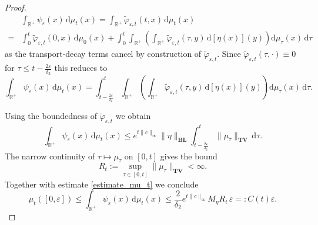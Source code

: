 \documentclass[10pt,a4paper]{amsart}
\newcommand{\BLN}{\mathbf{BL}}
\newcommand{\R}{\mathbb{R}}
\newcommand{\TV}{\mathbf{TV}}
\newcommand{\reali}{\mathbb{R}}
\newcommand{\ud}{\mathrm{d}}
\begin{document}
\begin{proof}
    \begin{align*}
&\int_{\R^+}\psi_\varepsilon(x)\,\ud\mu_t(x)
=\int_{\R^+}\tilde\varphi_{\varepsilon,t}(t,x)\,\ud\mu_t(x)\\
\iffalse
=&\int_0^t\tilde\varphi_{\varepsilon,t}(0,x)\,\ud\mu_0(x)\\
&+\int_0^t \int_{\reali^+} \left(
   \partial_{\tau}\tilde\varphi_{\varepsilon,t}(\tau,x) + b(x) \; \partial_x
   \tilde\varphi_{\varepsilon,t}(t,x) - c(x) \; \tilde\varphi_{\varepsilon,t}(t,x) \right)\,\ud\mu_{\tau}(x)\,\ud{\tau}   \\
   &+\int_0^t
\int_{\R^+}
\left(
\int_{\R^+}
\tilde \varphi_{\varepsilon,t}(\tau,y)\,
\ud[\eta(x)](y)
\right)
\ud\mu_\tau(x)\,\ud\tau\\
\fi
=&\int_0^t\tilde\varphi_{\varepsilon,t}(0,x)\,\ud\mu_0(x)+
\int_0^t
\int_{\R^+}
\left(
\int_{\R^+}
\tilde \varphi_{\varepsilon,t}(\tau,y)\,
\ud[\eta(x)](y)
\right)
\ud\mu_\tau(x)\,\ud\tau
\end{align*}
as the transport-decay terms cancel
by construction of $\tilde \varphi_{\varepsilon,t}$. Since $\tilde \varphi_{\varepsilon,t}(\tau,\cdot)\equiv0$ for $\tau\leq t-\frac {2\varepsilon}{\delta_2}$ this reduces to
\[
\int_{\R^+}\psi_\varepsilon(x)\,\ud\mu_t(x)
=
\int_{t-\frac{2\varepsilon}{\delta_2}}^t
\int_{\R^+}
\left(
\int_{\R^+}
\tilde \varphi_{\varepsilon,t}(\tau,y)\,
\ud[\eta(x)](y)
\right)
\ud\mu_\tau(x)\,\ud\tau.
\]

\noindent Using the boundedness of $\tilde \varphi_{\varepsilon,t}$ we obtain
\[
\int_{\R^+}\psi_\varepsilon(x)\,\ud\mu_t(x)
\le
e^{t\|c\|_\infty}\|\eta\|_{\BLN}
\int_{t-\frac{2\varepsilon}{\delta_2}}^t
\|\mu_\tau\|_{\TV}\,\ud\tau.
\]
The narrow continuity of $\tau\mapsto\mu_\tau$ on $[0,t]$ gives the bound
\[
R_t:=
\sup_{\tau\in[0,t]}
\|\mu_\tau\|_{\TV}
<\infty.
\]
Together with estimate \eqref{estimate_mu_t} we conclude 
\[
\mu_t([0,\varepsilon])
\le
\int_{\R^+}\psi_\varepsilon(x)\,\ud\mu_t(x)
\le
\frac{2}{\delta_2}
e^{t\|c\|_\infty}
M_\eta R_t\,\varepsilon=:C(t)\varepsilon.
\]

\end{proof}
\end{document}
